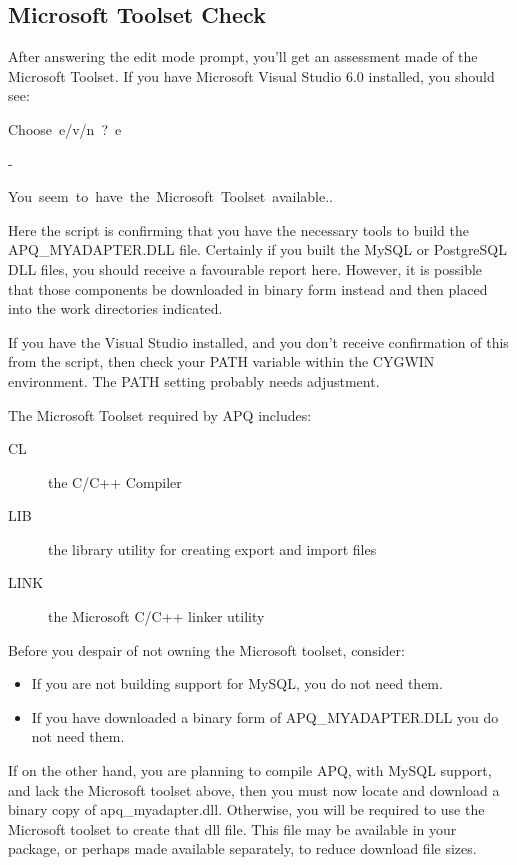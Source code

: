 \documentclass[english]{report}
\newenvironment{lyxcode}
   {\begin{list}{}{
     \setlength{\rightmargin}{\leftmargin}
     \setlength{\listparindent}{0pt}%
     \raggedright
     \setlength{\itemsep}{0pt}
     \setlength{\parsep}{0pt}
     \normalfont\ttfamily}%
    \item[]}
   {\end{list}}
\begin{document}
\subsection{Microsoft Toolset Check}

After answering the edit mode prompt, you'll get an assessment made
of the Microsoft Toolset. If you have Microsoft Visual Studio 6.0
installed, you should see:

\begin{lyxcode}
Choose~e/v/n~?~e

-

You~seem~to~have~the~Microsoft~Toolset~available..
\end{lyxcode}
Here the script is confirming that you have the necessary tools to
build the APQ\_MYADAPTER.DLL file. Certainly if you built the MySQL
or PostgreSQL DLL files, you should receive a favourable report here.
However, it is possible that those components be downloaded in binary
form instead and then placed into the work directories indicated.

If you have the Visual Studio installed, and you don't receive confirmation
of this from the script, then check your PATH variable within the
CYGWIN environment. The PATH setting probably needs adjustment.

The Microsoft Toolset required by APQ includes:

\begin{description}
\item [CL]the C/C++ Compiler
\item [LIB]the library utility for creating export and import files
\item [LINK]the Microsoft C/C++ linker utility
\end{description}
Before you despair of not owning the Microsoft toolset, consider:

\begin{itemize}
\item If you are not building support for MySQL, you do not need them. 
\item If you have downloaded a binary form of APQ\_MYADAPTER.DLL you do
not need them.
\end{itemize}
If on the other hand, you are planning to compile APQ, with MySQL
support, and lack the Microsoft toolset above, then you must now locate
and download a binary copy of apq\_myadapter.dll. Otherwise, you will
be required to use the Microsoft toolset to create that dll file.
This file may be available in your package, or perhaps made available
separately, to reduce download file sizes.
\end{document}

